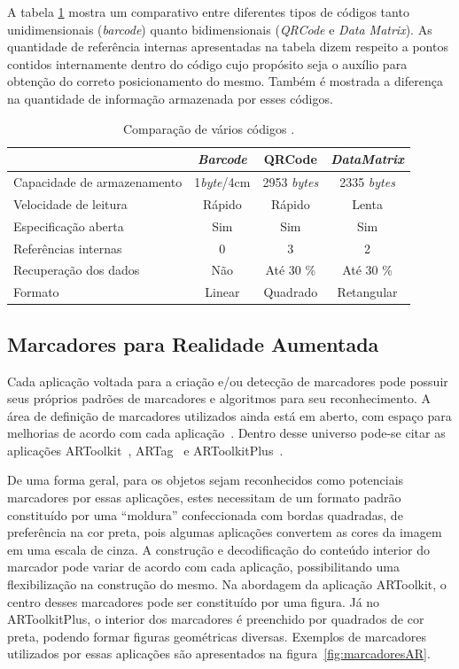 	A tabela \ref{tab:tabelaCodigos} mostra um comparativo entre diferentes tipos de códigos tanto
	unidimensionais (\textit{barcode}) quanto bidimensionais (\textit{QRCode} e \textit{Data Matrix}).
	As quantidade de referência internas apresentadas na tabela dizem respeito a pontos contidos
	internamente dentro do código cujo propósito seja o auxílio para obtenção do correto
 	posicionamento do mesmo. Também é mostrada a diferença na quantidade de informação armazenada por
	esses códigos.
	
	
	\begin{table} %
		\centering
		\caption{Comparação de vários códigos \cite{marlon}.}
		\begin{tabular}{lccc} 
			\hline %
			 & \textbf{\textit{Barcode}} & \textbf{QRCode} & \textbf{\textit{DataMatrix}} \\
			\hline
			\hline
			Capacidade de armazenamento & 1\textit{byte}/4cm	 & 2953 \textit{bytes} & 2335 \textit{bytes} \\
			Velocidade de leitura & Rápido & Rápido & Lenta\\
			Especificação aberta & Sim & Sim & Sim\\
			Referências internas & 0 & 3 & 2 \\ 
			Recuperação dos dados & Não & Até 30 \%  & Até 30 \% \\
			Formato & Linear & Quadrado & Retangular\\
			\hline
		\end{tabular}
		\label{tab:tabelaCodigos}
	\end{table}
	
\subsection{Marcadores para Realidade Aumentada}
\label{sec:marcadoresRA}
		
		Cada aplicação voltada para a criação e/ou detecção de marcadores pode possuir seus próprios
		padrões de marcadores e algoritmos para seu reconhecimento. A área de definição de marcadores
		utilizados ainda está em aberto, com espaço para melhorias de acordo com cada aplicação~\cite{fpga}. Dentro
		desse universo pode-se citar as aplicações ARToolkit~\cite{artoolkit}, ARTag~\cite{artag} e
		ARToolkitPlus~\cite{kler}.
		
		De uma forma geral, para os objetos sejam reconhecidos como potenciais marcadores por
		essas aplicações, estes necessitam de um formato padrão constituído por uma ``moldura''
		confeccionada com bordas quadradas, de preferência na cor preta, pois algumas aplicações convertem
		as cores da imagem em uma escala de cinza. A construção e decodificação do conteúdo interior do
		marcador pode variar de acordo com cada aplicação, possibilitando uma flexibilização na construção
		do mesmo. Na abordagem da aplicação ARToolkit, o centro desses marcadores pode ser constituído por
		uma figura. Já no ARToolkitPlus, o interior dos marcadores é preenchido por quadrados de cor
		preta, podendo formar figuras geométricas diversas. Exemplos de marcadores utilizados por essas
		aplicações são apresentados na figura~\ref{fig:marcadoresAR}. 
		
